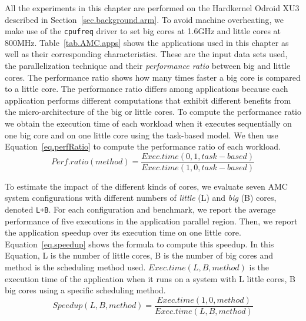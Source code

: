 All the experiments in this chapter are performed on the Hardkernel Odroid XU3 described in Section~\ref{sec.background.arm}. 
To avoid machine overheating, we make use of the \texttt{cpufreq} driver to set big cores at 1.6GHz and little cores at 800MHz. 
Table~\ref{tab.AMC.apps} shows the applications used in this chapter as well as their corresponding characteristics. These are the input data sets used, the parallelization technique and their \textit{performance ratio} between big and little cores.
The performance ratio shows how many times faster a big core is compared to a little core.
The performance ratio differs among applications because each application performs different computations that exhibit different benefits from the micro-architecture of the big or little cores. 
To compute the performance ratio we obtain the execution time of each workload when it executes sequentially on one big core and on one little core using the task-based model. 
We then use Equation~\ref{eq.perfRatio} to compute the performance ratio of each workload.
\begingroup\makeatletter\def\f@size{9}\check@mathfonts
\begin{equation}
\text{$Perf. ratio(method)$} = \frac{\text{$Exec. time(0, 1, task-based)$}}{\text{$Exec. time(1, 0, task-based)$}}
\label{eq.perfRatio}
\end{equation}
\endgroup

To estimate the impact of the different kinds of cores, we evaluate seven AMC system configurations with different numbers of \textit{little} (L) and \textit{big} (B) cores, denoted \texttt{L+B}.
For each configuration and benchmark, we report the average performance of five executions in the application parallel region. 
Then, we report the application speedup over its execution time on one little core.
Equation~\ref{eq.speedup} shows the formula to compute this speedup.
In this Equation, L is the number of little cores, B is the number of big cores and method is the scheduling method used.
$Exec. time (L, B, method)$ is the execution time of the application when it runs on a system with L little cores, B big cores using a specific scheduling method.
\begingroup\makeatletter\def\f@size{9}\check@mathfonts
\begin{equation}
\text{$Speedup(L, B, method)$} = \frac{\text{$Exec. time(1, 0, method)$}}{\text{$Exec. time(L, B, method)$}}
\label{eq.speedup}
\end{equation}
\endgroup

